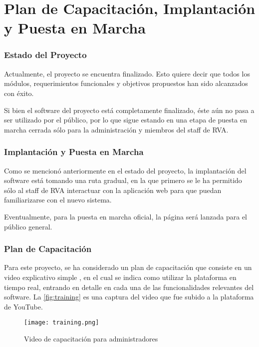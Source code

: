 \chapter{Plan de Capacitación, Implantación y Puesta en Marcha}

\subsection{Estado del Proyecto}
Actualmente, el proyecto se encuentra finalizado. Esto quiere decir que todos los módulos, requerimientos funcionales y objetivos propuestos han sido alcanzados con éxito.

Si bien el software del proyecto está completamente finalizado, éste aún no pasa a ser utilizado por el público, por lo que sigue estando en una etapa de puesta en marcha cerrada sólo para la administración y miembros del staff de RVA.

\subsection{Implantación y Puesta en Marcha}
Como se mencionó anteriormente en el estado del proyecto, la implantación del software está tomando una ruta gradual, en la que primero se le ha permitido sólo al staff de RVA interactuar con la aplicación web para que puedan familiarizarse con el nuevo sistema.

Eventualmente, para la puesta en marcha oficial, la página será lanzada para el público general.

\subsection{Plan de Capacitación}
Para este proyecto, se ha considerado un plan de capacitación que consiste en un video explicativo simple \cite{adminwalkthrough}, en el cual se indica como utilizar la plataforma en tiempo real, entrando en detalle en cada una de las funcionalidades relevantes del software. La \autoref{fig:training} es una captura del video que fue subido a la plataforma de YouTube.

\begin{figure}[H]
  \begin{center}
    \texttt{[image: training.png]}
  \end{center}
  \caption[Video de capacitación para administradores]{Video de capacitación para administradores}
  \label{fig:training}
\end{figure}
